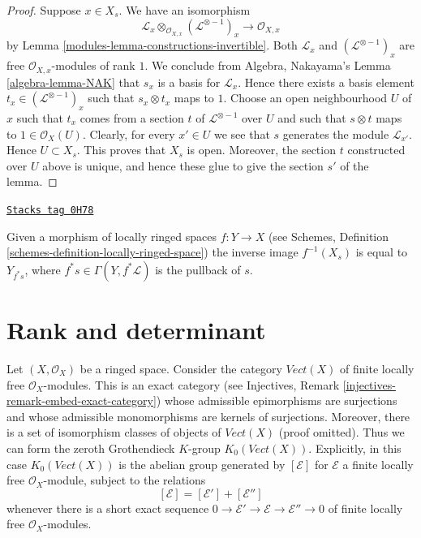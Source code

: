 \begin{proof}

Suppose $x \in X_s$.
We have an isomorphism
$$
\mathcal{L}_x \otimes_{\mathcal{O}_{X, x}} (\mathcal{L}^{\otimes -1})_x
\longrightarrow
\mathcal{O}_{X, x}
$$
by Lemma \ref{modules-lemma-constructions-invertible}.
Both $\mathcal{L}_x$ and $(\mathcal{L}^{\otimes -1})_x$
are free $\mathcal{O}_{X, x}$-modules of rank $1$. We conclude
from Algebra, Nakayama's Lemma \ref{algebra-lemma-NAK} that
$s_x$ is a basis for $\mathcal{L}_x$. Hence there exists
a basis element $t_x \in (\mathcal{L}^{\otimes -1})_x$
such that $s_x \otimes t_x$ maps to $1$.
Choose an open neighbourhood $U$ of
$x$ such that $t_x$ comes from a section $t$
of $\mathcal{L}^{\otimes -1}$ over $U$ and such that
$s \otimes t$ maps to $1 \in \mathcal{O}_X(U)$.
Clearly, for every $x' \in U$ we see that $s$ generates
the module $\mathcal{L}_{x'}$. Hence $U \subset X_s$.
This proves that $X_s$ is open. Moreover, the section
$t$ constructed over $U$ above is unique, and hence
these glue to give the section $s'$ of the lemma.
\end{proof}

\begin{remark}
\label{modules-remark-pullback-s-open}
\href{https://stacks.math.columbia.edu/tag/0H78}{\texttt{Stacks tag 0H78}}

Given a morphism of locally ringed spaces $f : Y \to X$
(see Schemes, Definition \ref{schemes-definition-locally-ringed-space})
the inverse image $f^{-1}(X_s)$ is equal to $Y_{f^*s}$, where
$f^*s \in \Gamma(Y, f^*\mathcal{L})$ is the pullback of $s$.
\end{remark}

\section{Rank and determinant}
\label{modules-section-rank-and-det}
Let $(X, \mathcal{O}_X)$ be a ringed space. Consider the category
$\textit{Vect}(X)$ of finite locally free $\mathcal{O}_X$-modules.
This is an exact category
(see Injectives, Remark \ref{injectives-remark-embed-exact-category})
whose admissible epimorphisms are
surjections and whose admissible monomorphisms are kernels of
surjections. Moreover, there is a set of isomorphism classes
of objects of $\textit{Vect}(X)$ (proof omitted). Thus we can form
the zeroth Grothendieck $K$-group $K_0(\textit{Vect}(X))$.
Explicitly, in this case $K_0(\textit{Vect}(X))$
is the abelian group generated by $[\mathcal{E}]$ for $\mathcal{E}$
a finite locally free $\mathcal{O}_X$-module, subject to the relations
$$
[\mathcal{E}] = [\mathcal{E}'] + [\mathcal{E}'']
$$
whenever there is a short exact sequence
$0 \to \mathcal{E}' \to \mathcal{E} \to \mathcal{E}'' \to 0$
of finite locally free $\mathcal{O}_X$-modules.

